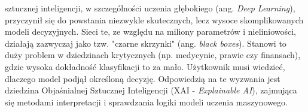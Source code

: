 \documentclass[10pt,journal,compsoc]{IEEEtran}
\begin{document}
\maketitle


\IEEEdisplaynontitleabstractindextext


%
\IEEEpeerreviewmaketitle



 sztucznej inteligencji, w szczególności uczenia głębokiego (ang. \textit{Deep Learning}), przyczynił się do powstania niezwykle skutecznych, lecz wysoce skomplikowanych modeli decyzyjnych. Sieci te, ze względu na miliony parametrów i nieliniowości, działają zazwyczaj jako tzw. "czarne skrzynki" (ang. \textit{black boxes}). Stanowi to duży problem w dziedzinach krytycznych (np. medycynie, prawie czy finansach), gdzie wysoka dokładność klasyfikacji to za mało. Użytkownik musi wiedzieć, dlaczego model podjął określoną decyzję. Odpowiedzią na te wyzwania jest dziedzina Objaśnialnej Sztucznej Inteligencji (XAI - \textit{Explainable AI}), zajmująca się metodami interpretacji i sprawdzania logiki modeli uczenia maszynowego.
\end{document}
